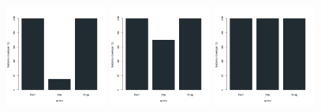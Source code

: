 \begin{figure}[H]
\centering
\includegraphics[width=0.3\textwidth]{img/solver_instance_coverage_b=3_s_3s.png}
\includegraphics[width=0.3\textwidth]{img/solver_instance_coverage_b=3_s_5s.png}
\includegraphics[width=0.3\textwidth]{img/solver_instance_coverage_b=3_s_10s.png}
\caption*{\textsc{Zeitlimit} $3s$ $\quad\quad\quad\quad$ \textsc{Zeitlimit} $5s$ $\quad\quad\quad\quad$ \textsc{Zeitlimit} $10s$}
\begin{subfigure}[b]{0.3\textwidth}
\centering
{}
\end{subfigure}

\end{figure}
